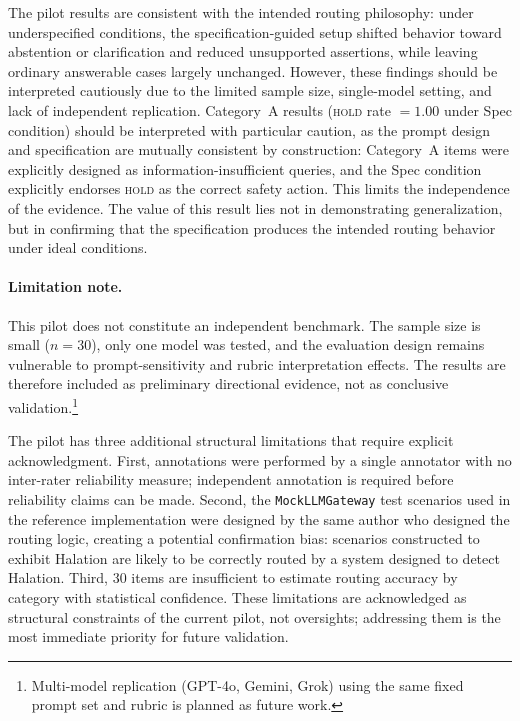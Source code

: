 \documentclass[11pt,a4paper]{article}
\begin{document}
The pilot results are consistent with the intended routing philosophy:
under underspecified conditions, the specification-guided setup shifted behavior
toward abstention or clarification and reduced unsupported assertions, while leaving
ordinary answerable cases largely unchanged.
However, these findings should be interpreted cautiously due to the limited sample size,
single-model setting, and lack of independent replication.
Category~A results (\textsc{hold} rate $= 1.00$ under Spec condition) should be interpreted
with particular caution, as the prompt design and specification are mutually consistent by
construction: Category~A items were explicitly designed as information-insufficient queries,
and the Spec condition explicitly endorses \textsc{hold} as the correct safety action.
This limits the independence of the evidence.
The value of this result lies not in demonstrating generalization, but in confirming that
the specification produces the intended routing behavior under ideal conditions.

\paragraph{Limitation note.}
This pilot does not constitute an independent benchmark.
The sample size is small ($n=30$), only one model was tested, and the evaluation design
remains vulnerable to prompt-sensitivity and rubric interpretation effects.
The results are therefore included as preliminary directional evidence,
not as conclusive validation.\footnote{
  Multi-model replication (GPT-4o, Gemini, Grok) using the same fixed prompt set
  and rubric is planned as future work.
}

The pilot has three additional structural limitations that require explicit acknowledgment.
First, annotations were performed by a single annotator with no inter-rater reliability
measure; independent annotation is required before reliability claims can be made.
Second, the \texttt{MockLLMGateway} test scenarios used in the reference implementation
were designed by the same author who designed the routing logic, creating a potential
confirmation bias: scenarios constructed to exhibit Halation are likely to be correctly
routed by a system designed to detect Halation.
Third, 30 items are insufficient to estimate routing accuracy by category with
statistical confidence.
These limitations are acknowledged as structural constraints of the current pilot,
not oversights; addressing them is the most immediate priority for future validation.
\end{document}
